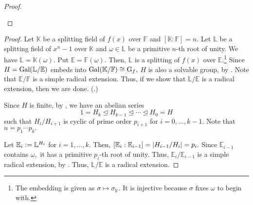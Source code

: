 \begin{proof}
\begin{center}
    \end{center}    
\end{proof}

\solvgroupimpliesradical*\label{thm:solvgroupimpliesradical2}
\begin{flushright}\hyperref[thm:solvgroupimpliesradical]{\upsym}\end{flushright}
\begin{proof}
    Let $\mathbb{K}$ be a splitting field of $f(x)$ over $\mathbb{F}$ and $[\mathbb{K} : \mathbb{F}] = n.$ Let $\mathbb{L}$ be a splitting field of $x^n - 1$ over $\mathbb{K}$ and $\omega \in \mathbb{L}$ be a primitive $n$-th root of unity. We have $\mathbb{L} = \mathbb{K}(\omega).$ Put $\mathbb{E} = \mathbb{F}(\omega).$ Then, $\mathbb{L}$ is a splitting of $f(x)$ over $\mathbb{E}.$\footnote{The embedding is given as $\sigma \mapsto \sigma_{\mathbb{K}}.$ It is injective because $\sigma$ fixes $\omega$ to begin with.} Since $H = \operatorname{Gal}(\mathbb{L}/\mathbb{E})$ embeds into $\operatorname{Gal}(\mathbb{K}/\mathbb{F}) \cong \operatorname{G}_f,$ $H$ is also a solvable group, by . Note that $\mathbb{E}/\mathbb{F}$ is a simple radical extension. Thus, if we show that $\mathbb{L}/\mathbb{E}$ is a radical extension, then we are done. (.)

    Since $H$ is finite, by , we have an abelian series
    \begin{equation*} 
        1 = H_k \unlhd H_{k - 1} \unlhd \cdots \unlhd H_0 = H
    \end{equation*}
    such that $H_i/H_{i + 1}$ is cyclic of prime order $p_{i + 1}$ for $i = 0, \ldots, k - 1.$ Note that $n = p_1 \cdots p_k.$

    Let $\mathbb{E}_i \vcentcolon= \mathbb{L}^{H_i}$ for $i = 1, \ldots, k.$ Then, $[\mathbb{E}_i : \mathbb{E}_{i - 1}] = {\left\lvert H_{i - 1}/H_i \right\lvert} = p_i.$ Since $\mathbb{E}_{i - 1}$ contains $\omega,$ it has a primitive $p_i$-th root of unity. Thus, $\mathbb{E}_i/\mathbb{E}_{i - 1}$ is a simple radical extension, by . Thus, $\mathbb{L}/\mathbb{E}$ is a radical extension.
\end{proof}